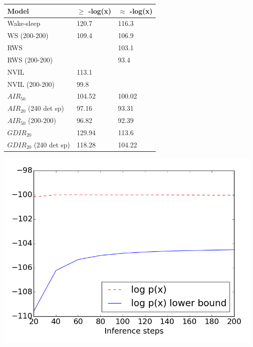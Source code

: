 \documentclass{article} %
\begin{document}
\begin{minipage}{\textwidth}
    \begin{minipage}[l]{0.5\textwidth}

\begin{tabular}{ | m{8.7em} | m{1.4cm}| m{1.4cm} | } 
\hline
Model & $\ge$ -log(x) & $\approx$ -log(x) \\ 
\hline
\hline
Wake-sleep & 120.7 & 116.3 \\ 
WS (200-200) & 109.4 & 106.9 \\
RWS & & 103.1 \\
RWS (200-200) & & 93.4 \\
\hline
NVIL & 113.1 &  \\
NVIL (200-200) & 99.8 & \\ 
\hline
$AIR_{50}$ & 104.52 & 100.02 \\
$AIR_{20}$ (240 det sp) & 97.16 & 93.31 \\
$AIR_{50}$ (200-200) & 96.82 & 92.39 \\
\hline
$GDIR_{20}$ & 129.94 & 113.6 \\
$GDIR_{20}$ (240 det sp) & 118.28  & 104.22 \\
\hline
\end{tabular}
\label{table:binary}

\end{minipage}
    \hspace{0.05\textwidth}
    \begin{minipage}[r]{0.43\textwidth}

\includegraphics[scale=0.3]{figures/binary_eval}
\label{fig:binary}
        \end{minipage}
\end{minipage}
\end{document}
